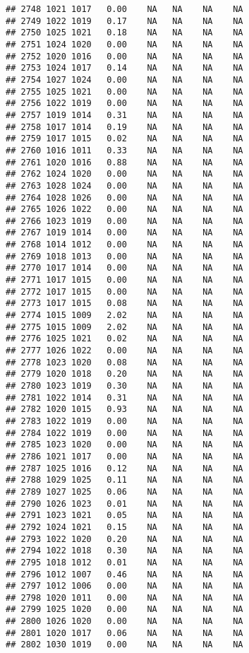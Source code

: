 \documentclass{article}\usepackage{graphicx, color}
\makeatletter
\newenvironment{kframe}{%
 \def\at@end@of@kframe{}%
 \ifinner\ifhmode%
  \def\at@end@of@kframe{\end{minipage}}%
  \begin{minipage}{\columnwidth}%
 \fi\fi%
 \def\FrameCommand##1{\hskip\@totalleftmargin \hskip-\fboxsep
 \colorbox{shadecolor}{##1}\hskip-\fboxsep
     \hskip-\linewidth \hskip-\@totalleftmargin \hskip\columnwidth}%
 \MakeFramed {\advance\hsize-\width
   \@totalleftmargin\z@ \linewidth\hsize
   \@setminipage}}%
 {\par\unskip\endMakeFramed%
 \at@end@of@kframe}
\newenvironment{knitrout}{}{} %
\makeatother
\begin{document}
\begin{knitrout}
\begin{kframe}
\begin{verbatim}
## 2748 1021 1017   0.00    NA   NA    NA    NA
## 2749 1022 1019   0.17    NA   NA    NA    NA
## 2750 1025 1021   0.18    NA   NA    NA    NA
## 2751 1024 1020   0.00    NA   NA    NA    NA
## 2752 1020 1016   0.00    NA   NA    NA    NA
## 2753 1024 1017   0.14    NA   NA    NA    NA
## 2754 1027 1024   0.00    NA   NA    NA    NA
## 2755 1025 1021   0.00    NA   NA    NA    NA
## 2756 1022 1019   0.00    NA   NA    NA    NA
## 2757 1019 1014   0.31    NA   NA    NA    NA
## 2758 1017 1014   0.19    NA   NA    NA    NA
## 2759 1017 1015   0.02    NA   NA    NA    NA
## 2760 1016 1011   0.33    NA   NA    NA    NA
## 2761 1020 1016   0.88    NA   NA    NA    NA
## 2762 1024 1020   0.00    NA   NA    NA    NA
## 2763 1028 1024   0.00    NA   NA    NA    NA
## 2764 1028 1026   0.00    NA   NA    NA    NA
## 2765 1026 1022   0.00    NA   NA    NA    NA
## 2766 1023 1019   0.00    NA   NA    NA    NA
## 2767 1019 1014   0.00    NA   NA    NA    NA
## 2768 1014 1012   0.00    NA   NA    NA    NA
## 2769 1018 1013   0.00    NA   NA    NA    NA
## 2770 1017 1014   0.00    NA   NA    NA    NA
## 2771 1017 1015   0.00    NA   NA    NA    NA
## 2772 1017 1015   0.00    NA   NA    NA    NA
## 2773 1017 1015   0.08    NA   NA    NA    NA
## 2774 1015 1009   2.02    NA   NA    NA    NA
## 2775 1015 1009   2.02    NA   NA    NA    NA
## 2776 1025 1021   0.02    NA   NA    NA    NA
## 2777 1026 1022   0.00    NA   NA    NA    NA
## 2778 1023 1020   0.08    NA   NA    NA    NA
## 2779 1020 1018   0.20    NA   NA    NA    NA
## 2780 1023 1019   0.30    NA   NA    NA    NA
## 2781 1022 1014   0.31    NA   NA    NA    NA
## 2782 1020 1015   0.93    NA   NA    NA    NA
## 2783 1022 1019   0.00    NA   NA    NA    NA
## 2784 1022 1019   0.00    NA   NA    NA    NA
## 2785 1023 1020   0.00    NA   NA    NA    NA
## 2786 1021 1017   0.00    NA   NA    NA    NA
## 2787 1025 1016   0.12    NA   NA    NA    NA
## 2788 1029 1025   0.11    NA   NA    NA    NA
## 2789 1027 1025   0.06    NA   NA    NA    NA
## 2790 1026 1023   0.01    NA   NA    NA    NA
## 2791 1023 1021   0.05    NA   NA    NA    NA
## 2792 1024 1021   0.15    NA   NA    NA    NA
## 2793 1022 1020   0.20    NA   NA    NA    NA
## 2794 1022 1018   0.30    NA   NA    NA    NA
## 2795 1018 1012   0.01    NA   NA    NA    NA
## 2796 1012 1007   0.46    NA   NA    NA    NA
## 2797 1012 1006   0.00    NA   NA    NA    NA
## 2798 1020 1011   0.00    NA   NA    NA    NA
## 2799 1025 1020   0.00    NA   NA    NA    NA
## 2800 1026 1020   0.00    NA   NA    NA    NA
## 2801 1020 1017   0.06    NA   NA    NA    NA
## 2802 1030 1019   0.00    NA   NA    NA    NA

\end{verbatim}
\end{kframe}
\end{knitrout}
\end{document}
